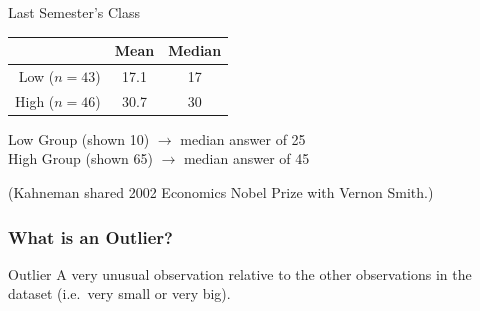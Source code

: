 \begin{frame}
\begin{block}{Last Semester's Class}
	\begin{table}[h]
		\begin{tabular}{r|cc}
					& Mean & Median\\
					\hline
			Low ($n=43$)& 17.1&17\\
			High ($n=46$)& 30.7&30
		\end{tabular}
	\end{table}
\end{block}
\pause
\begin{block}{\href{http://www.jstor.org/stable/1738360}{}}
Low Group (shown 10) $\rightarrow$ median answer of 25\\
High Group (shown 65) $\rightarrow$ median answer of 45
\end{block}

\vspace{2em}
\alert{ \footnotesize (Kahneman shared 2002 Economics Nobel Prize with Vernon Smith.)}
\end{frame}

\begin{frame}
\frametitle{What is an Outlier?}
	\begin{block}{Outlier}
	A very unusual observation relative to the other observations in the dataset (i.e.\ very small or very big).
\end{block}
\end{frame}


